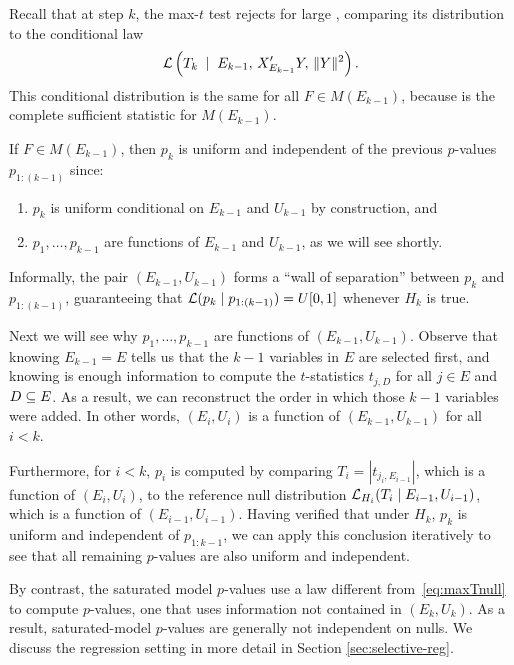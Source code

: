 \documentclass{article}
\begin{document}
Recall that at step $k$, the max-$t$ test rejects for large , comparing its distribution to the conditional law
\begin{equation}\label{eq:maxTnull}
\mathcal{L}\left(T_k \; \mid \; E_{k-1}, \,X_{E_{k-1}}'Y, \,\|Y\|^2 \right).
\end{equation}
This conditional distribution is the same for all $F\in M(E_{k-1})$, because  is the complete sufficient statistic for $M(E_{k-1})$.

If $F\in M(E_{k-1})$, then $p_k$ is uniform and independent of the previous $p$-values $p_{1:(k-1)}$ since:
\begin{enumerate}
\item $p_k$ is uniform conditional on $E_{k-1}$ and $U_{k-1}$ by construction, and
\item $p_1, \ldots, p_{k-1}$ are functions of $E_{k-1}$ and $U_{k-1}$, as we will see shortly.
\end{enumerate}
Informally, the pair $(E_{k-1}, U_{k-1})$ forms a ``wall of separation'' between $p_k$ and $p_{1:(k-1)}$, guaranteeing that $\mathcal{L}(p_k \mid p_{1:(k-1)}) = U[0,1]$ whenever $H_k$ is true.

Next we will see why $p_1,\ldots,p_{k-1}$ are functions of $(E_{k-1},U_{k-1})$. Observe that knowing $E_{k-1}=E$ tells us that the $k-1$ variables in $E$ are selected first, and knowing  is enough information to compute the $t$-statistics $t_{j,D}$ for all $j\in E$ and $D\subseteq E$. As a result, we can reconstruct the order in which those $k-1$ variables were added. In other words, $(E_i, U_i)$ is a function of $(E_{k-1}, U_{k-1})$ for all $i<k$.

Furthermore, for $i<k$, $p_i$ is computed by comparing $T_i=|t_{j_i, E_{i-1}}|$, which is a function of $(E_i, U_i)$, to the reference null distribution $\mathcal{L}_{H_i}(T_i \mid E_{i-1}, U_{i-1})$, which is a function of $(E_{i-1}, U_{i-1})$. Having verified that under $H_k$, $p_k$ is uniform and independent of $p_{1:{k-1}}$, we can apply this conclusion iteratively to see that all remaining $p$-values are also uniform and independent.

By contrast, the saturated model $p$-values use a law different from~\eqref{eq:maxTnull} to compute $p$-values, one that uses
information not contained in $(E_k,U_k)$. As a result, saturated-model $p$-values are generally not independent on nulls. We discuss the regression setting in more detail in Section \ref{sec:selective-reg}.
\end{document}
